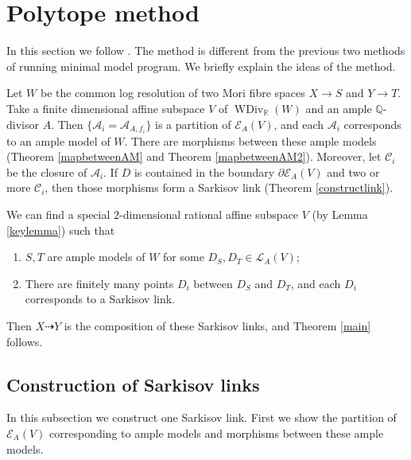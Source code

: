 \documentclass[11pt]{amsart}
\begin{document}
\section{Polytope method}\label{thirdmethod}
In this section we follow \cite{haconSarkisovProgram2012}.
The method is different from the previous two methods of running minimal model program. We briefly explain the ideas of the method.

Let $W$ be the common log resolution of two Mori fibre spaces $X\to S$ and $Y\to T$. Take a finite dimensional affine subspace $V$ of $\operatorname{WDiv}_{\mathbb{R}}(W)$ and an ample $\mathbb{Q}$-divisor $A$. Then $\{\mathcal{A}_{i} =\mathcal{A}_{A,f_{i}}\} $ is a partition of $\mathcal{E}_{A}(V)$, and each $\mathcal{A}_{i}$ corresponds to an ample model of $W$.    There are morphisms between these ample models (Theorem \ref{mapbetweenAM} and Theorem \ref{mapbetweenAM2}). Moreover, let $\mathcal{C}_{i}$ be the closure of $\mathcal{A}_{i}$. If $D$ is contained in the boundary  $\partial \mathcal{E}_{A}(V)$ and two or more $\mathcal{C}_{i}$, then those morphisms form a Sarkisov link (Theorem \ref{constructlink}).

We can find a special $2$-dimensional rational affine subspace  $V$ (by Lemma \ref{keylemma}) such that 
\begin{enumerate}
  \item $S,T$ are ample models of $W$ for some $D_{S},D_{T} \in \mathcal{L}_{A}(V)$;
  \item  There are finitely many points  $D_{i}$ between $D_{S}$ and $D_{T}$, and each $D_{i}$ corresponds to a Sarkisov link.
\end{enumerate}

Then  $X\dashrightarrow Y$ is the composition of these Sarkisov links, and  Theorem \ref{main} follows.

\subsection{Construction of Sarkisov links}
In this subsection we construct one Sarkisov link. First we show the partition of $\mathcal{E}_{A}(V)$  corresponding to ample models and morphisms between these ample models.
\end{document}
